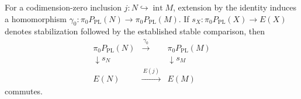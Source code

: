 \begin{lemma}\label{lem:component-followup-stable-square}
For a codimension-zero inclusion $j:N\hookrightarrow\operatorname{int}M$,
extension by the identity induces a homomorphism
$\gamma_0:\pi_0P_{\mathrm{PL}}(N)\to\pi_0P_{\mathrm{PL}}(M)$.
If $s_X:\pi_0P_{\mathrm{PL}}(X)\to E(X)$ denotes stabilization followed
by the established stable comparison, then
\[
\begin{array}{ccc}
\pi_0P_{\mathrm{PL}}(N)&\xrightarrow{\ \gamma_0\ }&
       \pi_0P_{\mathrm{PL}}(M)\\
\downarrow s_N&&\downarrow s_M\\
E(N)&\xrightarrow{\ E(j)\ }&E(M)
\end{array}
\tag{$*$}\label{eq:component-followup-stable-square}
\]
commutes.
\end{lemma}

